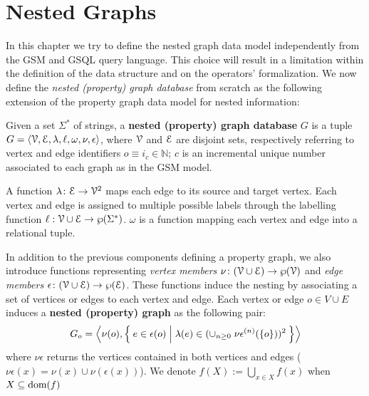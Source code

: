 \section{Nested Graphs}
\label{sec:model}
In this chapter we try to define the nested graph data model independently from the GSM and GSQL query language. This choice will result in a limitation within the definition of the data structure and on the operators' formalization. We now define the\textit{ nested (property) graph database} from scratch as the following extension of the property graph data model for nested information:

\begin{definition}
	Given a set $\Sigma^*$ of strings,
	a \textbf{nested (property) graph database} $G$ is a tuple $G=\Braket{\mathcal{V}, \mathcal{E}, \lambda,\ell,\omega,\nu,\epsilon}$, where $\mathcal{V}$ and $\mathcal{E}$ are disjoint sets, respectively referring to vertex and edge identifiers $o\equiv i_c\in\mathbb{N}$; $c$ is an incremental unique number associated to each graph as in the GSM model. 
	
	A function $\lambda\colon \mathcal{E}\to \mathcal{V}^2$ maps each edge to its source and target vertex. Each vertex and edge is assigned to multiple possible labels through the labelling function $\ell:\mathcal{V}\cup \mathcal{E}\to \wp(\Sigma^*)$.  $\omega$ is a function mapping each vertex and edge into a relational tuple.
	
	In addition to the previous components defining a property graph, we also introduce functions representing \textit{vertex members} $\nu\colon (\mathcal{V}\cup \mathcal{E})\to\wp(\mathcal{V})$ and \textit{edge members} $\epsilon\colon(\mathcal{V}\cup \mathcal{E})\to \wp(\mathcal{E})$. These functions induce the nesting by associating a set of vertices or edges to each vertex and edge. Each vertex or edge $o\in V\cup E$ induces a \textbf{nested (property) graph} as the following pair:
	\[G_o=\Braket{\nu(o),\Set{e\in\epsilon(o)|\lambda(e)\in (\cup_{n\geq 0}\;{\nu\epsilon}^{(n)}(\{o\}))^2}}\]
	where ${\nu\epsilon}$ returns the vertices contained in both vertices and edges ($\nu\epsilon(x)=\nu(x)\cup \nu(\epsilon(x))$). We denote $f(X){:=}\bigcup_{x\in X} f(x)$ when $X\subseteq \textup{dom}(f)$
\end{definition}


